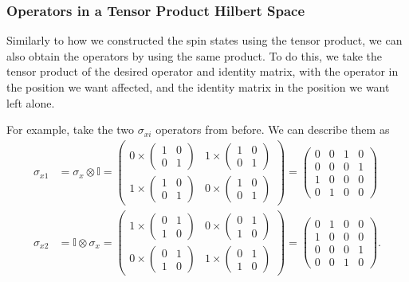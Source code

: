 \documentclass{article}
\begin{document}
\subsubsection{Operators in a Tensor Product Hilbert Space}
Similarly to how we constructed the spin states using the tensor product, we can also obtain the operators by using the same product. To do this, we take the tensor product of the desired operator and identity matrix, with the operator in the position we want affected, and the identity matrix in the position we want left alone.

For example, take the two $\sigma _{xi}$ operators from before. We can describe them as
\begin{align*}
    \sigma _{x1} &= \sigma _x\otimes \mathbb{I}=\begin{pmatrix}
        0\times\begin{pmatrix}
            1&0\\0&1
        \end{pmatrix}& 1\times\begin{pmatrix}
        1&0\\0&1
        \end{pmatrix}\\
        1\times\begin{pmatrix}
            1&0\\0&1
        \end{pmatrix}& 0\times\begin{pmatrix}
        1&0\\0&1
        \end{pmatrix}
    \end{pmatrix}=\begin{pmatrix}
    0&0&1&0\\
    0&0&0&1\\
    1&0&0&0\\
    0&1&0&0
    \end{pmatrix}\\
        \sigma _{x2}&=\mathbb{I}\otimes \sigma _x=\begin{pmatrix}
        1\times\begin{pmatrix}
            0&1\\1&0
        \end{pmatrix}&0\times\begin{pmatrix}
        0&1\\1&0
        \end{pmatrix}\\
        0\times\begin{pmatrix}
            0&1\\1&0
        \end{pmatrix}&1\times\begin{pmatrix}
        0&1\\1&0
        \end{pmatrix}
    \end{pmatrix}=\begin{pmatrix}
    0&1&0&0\\
    1&0&0&0\\
    0&0&0&1\\
    0&0&1&0
    \end{pmatrix}.
\end{align*}
\end{document}
